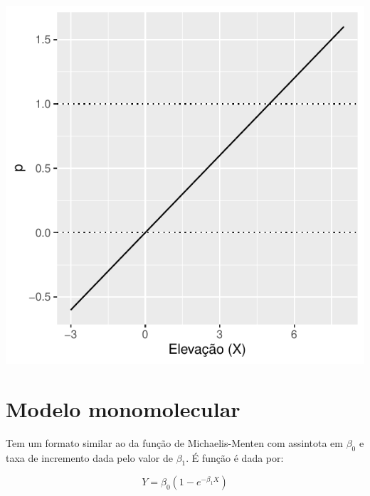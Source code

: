 \documentclass[
]{book}
\begin{document}
\begin{center}\includegraphics{probest-cambientais_files/figure-latex/unnamed-chunk-230-1} \end{center}

\hypertarget{modelo-monomolecular}{%
\section{Modelo monomolecular}\label{modelo-monomolecular}}

Tem um formato similar ao da função de Michaelis-Menten com assintota em \(\beta_0\) e taxa de incremento dada pelo valor de \(\beta_1\). É função é dada por:

\[Y = \beta_0 (1 - e^{-\beta_1 X})\]
\end{document}
